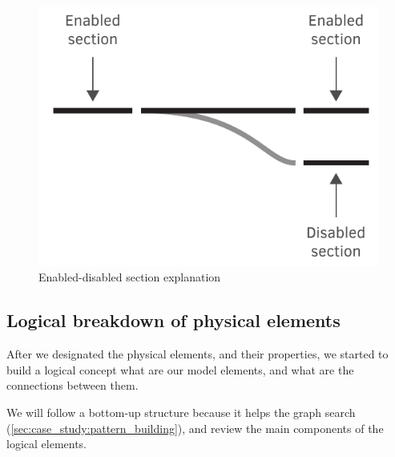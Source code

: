\begin{figure}[h]
	\centering
	\includegraphics[width=0.5\linewidth]{include/figures/chapter_6/metamodel_switch_endi}
	\caption{Enabled-disabled section explanation}
	\label{fig:case_study:metamodel_switch_endi}
\end{figure}

\subsection{Logical breakdown of physical elements}
\label{sec:case_study:logical_breakdown}
After we designated the physical elements, and their properties, we started to build a logical concept what are our model elements, and what are the connections between them.

We will follow a bottom-up structure because it helps the graph search (\cref{sec:case_study:pattern_building}), and review the main components of the logical elements.

